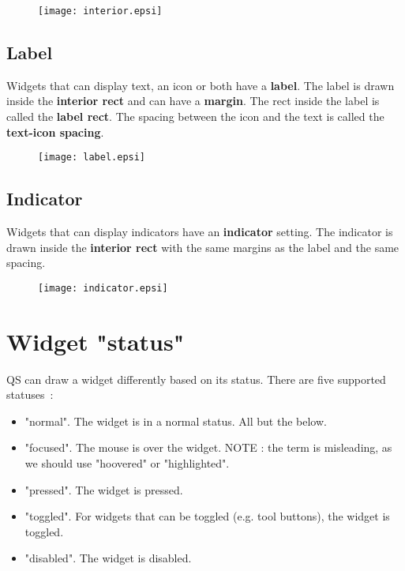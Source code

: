 \documentclass[a4paper,12pt]{report}
\begin{document}
\begin{figure}[hbtp]
  \centering
  \texttt{[image: interior.epsi]}
\end{figure}

\subsection{Label}
Widgets that can display text, an icon or both have a \textbf{label}. The label
is drawn inside the \textbf{interior rect} and can have a \textbf{margin}. The
rect inside the label is called the \textbf{label rect}. The spacing between
the icon and the text is called the \textbf{text-icon spacing}.\\

\begin{figure}[hbtp]
  \centering
  \texttt{[image: label.epsi]}
\end{figure}

\subsection{Indicator}
Widgets that can display indicators have an \textbf{indicator} setting. The
indicator is drawn inside the \textbf{interior rect} with the same margins as
the label and the same spacing.\\

\begin{figure}[hbtp]
  \centering
  \texttt{[image: indicator.epsi]}
\end{figure}

\section{Widget "status"}
QS can draw a widget differently based on its status. There are five supported
statuses~:

\begin{itemize}
  \item "normal". The widget is in a normal status. All but the below.
  \item "focused". The mouse is over the widget. NOTE : the term is misleading,
as we should use "hoovered" or "highlighted".
  \item "pressed". The widget is pressed.
  \item "toggled". For widgets that can be toggled (e.g. tool buttons), the
widget is toggled.
  \item "disabled". The widget is disabled.
\end{itemize}
\end{document}
